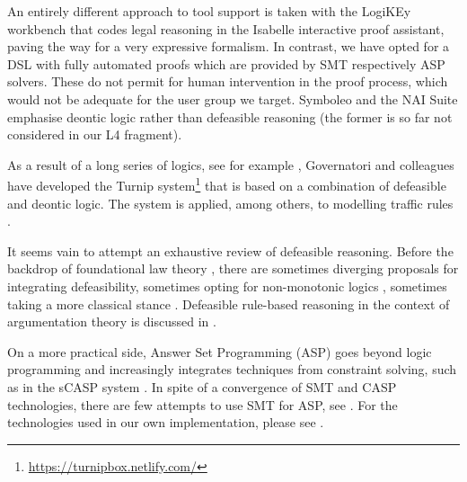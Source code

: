 An entirely different approach to tool support is taken with the LogiKEy \cite{benzmueller_etal_logikey_2020}
workbench that codes legal reasoning in the Isabelle interactive proof assistant, paving
the way for a very expressive formalism. In contrast, we have opted for a DSL
with fully automated proofs which are provided by SMT respectively ASP solvers. These do not permit for human intervention in the proof process, which would not be adequate for the user group we target. Symboleo
\cite{sarifi_parvizimosaed_amyot_logrippo_mylopoulos_Symboleo_spec_legal_contracts_2020}
and the NAI Suite
\cite{libal_steen_nai_suite_draft_reason_legal_texts_jurix_2019} emphasise
deontic logic rather than defeasible reasoning (the former is so far not
considered in our L4 fragment).

As a result of a long series of logics, see for example
\cite{governatori_carnead_defeas_logic_icail_2011,governatori21:_unrav_legal_refer_defeas_deont_logic},
Governatori and colleagues have developed the Turnip
system\footnote{\url{https://turnipbox.netlify.com/}} that is based on a
combination of defeasible and deontic logic. The system is applied, among
others, to modelling traffic rules
\cite{governatori_Traffic_Rules_Encoding_using_Defeasible_jurix_2020}.

It seems vain to attempt an exhaustive
review of defeasible reasoning. Before the backdrop of foundational law
theory \cite{hart_concept_of_law_1997}, there are sometimes diverging
proposals for integrating defeasibility, sometimes opting for non-monotonic
logics \cite{hage_law_and_defeasibility_2003}, sometimes taking a more
classical stance \cite{alchourron_makinson_hierarchies_of_regulations_1981}. 
Defeasible rule-based reasoning in the context of argumentation theory is
discussed in \cite{dung_argumentation_theory_1995,amgoud_besnard_rule_based_argumentation_systems_2019}.

On a more practical side, Answer Set Programming (ASP) \cite{asp_background}
goes beyond logic programming and increasingly integrates techniques from
constraint solving, such as in the sCASP system
\cite{arias_phd_2019}. In spite of a convergence of SMT and CASP technologies,
there are few attempts to use SMT for ASP, see
\cite{shen_lierler_smt_answer_set_kr_2018}. For the technologies used in our
own implementation, please see . 





